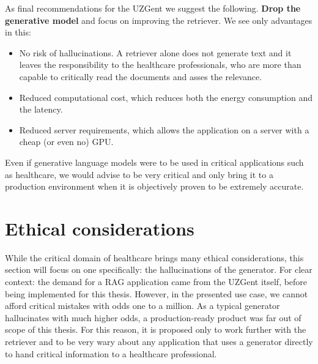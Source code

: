 As final recommendations for the UZGent we suggest the following. \textbf{Drop the generative model} and focus on improving the retriever. We see only advantages in this:
\begin{itemize}
    \item No risk of hallucinations. A retriever alone does not generate text and it leaves the responsibility to the healthcare professionals, who are more than capable to critically read the documents and asses the relevance.
    \item Reduced computational cost, which reduces both the energy consumption and the latency.
    \item Reduced server requirements, which allows the application on a server with a cheap (or even no) GPU.
\end{itemize}
Even if generative language models were to be used in critical applications such as healthcare, we would advise to be very critical and only bring it to a production environment when it is objectively proven to be extremely accurate.

\section{Ethical considerations}
\label{Ethical considerations}
While the critical domain of healthcare brings many ethical considerations, this section will focus on one specifically: the hallucinations of the generator. For clear context: the demand for a RAG application came from the UZGent itself, before being implemented for this thesis. However, in the presented use case, we cannot afford critical mistakes with odds one to a million. As a typical generator hallucinates with much higher odds, a production-ready product was far out of scope of this thesis. For this reason, it is proposed only to work further with the retriever and to be very wary about any application that uses a generator directly to hand critical information to a healthcare professional. 

